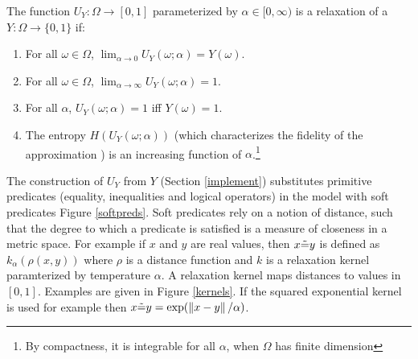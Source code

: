 
\begin{definition}
The function $U_Y : \Omega \to [0, 1]$ parameterized by $\alpha \in [0, \infty)$ is a relaxation of a $Y: \Omega \to \{0, 1\}$ if:
\begin{enumerate}[label=(\roman*)]
	\label{def:temp}
	\item For all $\omega \in \Omega$, $\lim_{\alpha \to 0}U_Y(\omega; \alpha) = Y(\omega)$.
	\item For all $\omega \in \Omega$, $\lim_{\alpha \to \infty}U_Y(\omega; \alpha) = 1$.

    \item For all $\alpha$, $U_Y(\omega; \alpha) = 1$ iff $Y(\omega) = 1$.
    \item The entropy $H(U_Y(\omega; \alpha))$ (which characterizes the fidelity of the approximation ) is an increasing function of $\alpha$.\footnote
    {By compactness, it is integrable for all $\alpha$, when $\Omega$ has finite dimension}
\end{enumerate}
\end{definition}


The construction of $U_Y$ from $Y$ (Section \ref{implement}) substitutes primitive predicates (equality, inequalities and logical operators) in the model with soft predicates Figure \ref{softpreds}.  Soft predicates rely on a notion of distance, such that the degree to which a predicate is satisfied is a measure of closeness in a metric space. 
For example if $x$ and $y$ are real values, then $x \tilde{=} y$ is defined as $k_\alpha(\rho(x, y))$ where $\rho$ is a distance function and $k$ is a relaxation kernel paramterized by temperature $\alpha$.
A relaxation kernel maps distances to values in $[0, 1]$.
Examples are given in Figure \ref{kernels}.
If the squared exponential kernel is used for example then $x \tilde{=} y = \exp(\left\|{{x - y}}\right\|/\alpha)$.

